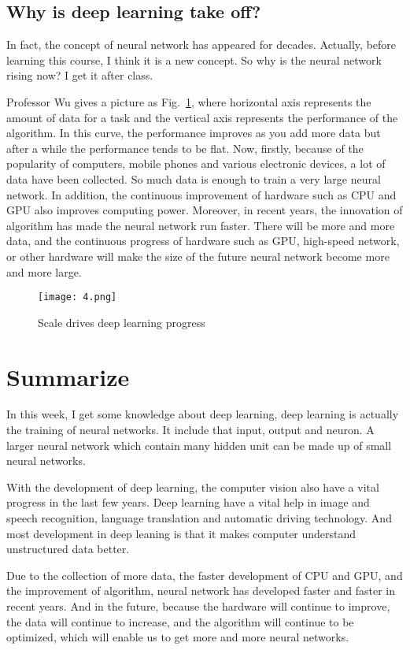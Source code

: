 \documentclass[a4paper]{article}
\begin{document}
\subsection{Why is deep learning take off?}
In fact, the concept of neural network has appeared for decades. Actually, before learning this course, I think it is a new concept. So why is the neural network rising now? I get it after class. 
\par
Professor Wu gives a picture as Fig.~\ref{4}\cite{note}, where horizontal axis represents the amount of data for a task and the vertical axis represents the performance of the algorithm. In this curve, the performance improves as you add more data but after a while the
performance tends to be flat. Now, firstly, because of the popularity of computers, mobile phones and various electronic devices, a lot of data have been collected. So much data is enough to train a very large neural network. In addition, the continuous improvement of hardware such as CPU and GPU also improves computing power. Moreover, in recent years, the innovation of algorithm has made the neural network run faster. There will be more and more data, and the continuous progress of hardware such as GPU, high-speed network, or other hardware will make the size of the future neural network become more and more large.
\begin{figure}
\begin{center}
  \texttt{[image: 4.png]}\\
  \caption{Scale drives deep learning progress}\label{4}
\end{center}
\end{figure}
\par
\section{Summarize}
\par
In this week, I get some knowledge about deep learning, deep learning is actually the training of neural networks. It include that input, output and neuron. A larger neural network which contain many hidden unit can be made up of small neural networks. 
\par 
With the development of deep learning, the computer vision also have a vital progress in the last few years. Deep learning have a vital help in image and speech recognition, language translation and automatic driving technology. And most development in deep leaning is that it makes computer understand unstructured data better.
\par 
Due to the collection of more data, the faster development of CPU and GPU, and the improvement of algorithm, neural network has developed faster and faster in recent years. And in the future, because the hardware will continue to improve, the data will continue to increase, and the algorithm will continue to be optimized, which will enable us to get more and more neural networks. 
{\small


}
\end{document}
